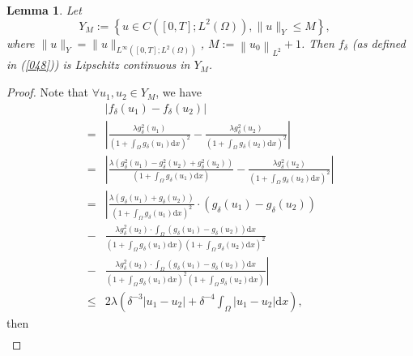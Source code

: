 \documentclass{article}
\numberwithin{equation}{section}
\newtheorem{lemma}{Lemma}[section]
\begin{document}
\begin{lemma}
    Let $$ Y_{M}:=\left\{u \in C\left([0, T] ; L^{2}(\Omega)\right), \|u\|_{Y}\le  M \right\} ,\quad  $$
    where $\|u\|_{Y}=\|u\|_{L^{\infty}\left([0, T] ; L^{2}(\Omega)\right)}$, $M :=\left\|u_{0}\right\|_{L^{2}} +1$. Then $f_\delta$ (as defined in (\ref{048})) is Lipschitz continuous in $Y_M$.
\end{lemma}

\begin{proof}
    Note that
    $\forall u_1, u_2\in Y_M$, we have
    \begin{equation}
    \begin{aligned}
    &\left|f_{\delta}(u_1)-f_{\delta}\left(u_2\right)\right|
    \\=&\left|\frac{\lambda g_{\delta}^{2}(u_1) }{\left(1+\int_{\Omega} g_{\delta}(u_1) \mathrm{d} x\right)^{2}}-\frac{\lambda g_{\delta}^{2}(u_2) }{\left(1+\int_{\Omega} g_{\delta}(u_2) \mathrm{d} x\right)^{2}}\right|
    \\=&\left|\frac{\lambda\left( g_{\delta}^{2}(u_1) -
     g_{\delta}^{2}(u_2) + g_{\delta}^{2}(u_2) \right)}{\left(1+\int_{\Omega} g_{\delta}(u_1) \mathrm{d} x\right)}-\frac{\lambda g_{\delta}^{2}(u_2) }{\left(1+\int_{\Omega} g_{\delta}(u_2) \mathrm{d} x\right)^{2}}\right|
    \\=  &\left| \frac{\lambda\left(g_{\delta}(u_1)+g_{\delta}\left(u_2\right)\right)}{\left(1+\int_{\Omega} g_{\delta}(u_1) \mathrm{d} x\right)^{2}} \cdot\left(g_{\delta}(u_1)-g_{\delta}\left(u_2\right)\right) \right.
    \\ -&\frac{\lambda g_{\delta}^{2}\left(u_2\right) \cdot \int_{\Omega}\left(g_{\delta}(u_1)-g_{\delta}\left(u_2\right)\right) \mathrm{d} x}{\left(1+\int_{\Omega} g_{\delta}(u_1) \mathrm{d} x\right)^{}\left(1+\int_{\Omega} g_{\delta}\left(u_2\right) \mathrm{d} x\right)^{2}}
    \\-&\left. \frac{\lambda g_{\delta}^{2} \left(u_2\right)  \cdot \int_{\Omega}\left(g_{\delta}(u_1)-g_{\delta}\left(u_2\right)\right) \mathrm{d} x}{\left(1+\int_{\Omega} g_{\delta}(u_1) \mathrm{d} x\right)^{2}\left(1+\int_{\Omega} g_{\delta}\left(u_2\right) \mathrm{d} x\right)^{}} \right|
    \\ \le &2 \lambda\left(\delta^{-3}\left|u_1-u_2\right|+\delta^{-4} \int_{\Omega}\left|u_1-u_2\right| \mathrm{d} x\right),
    \end{aligned}\label{015}
    \end{equation}
    then
    \begin{equation*}
    \begin{aligned}

\end{aligned}
\end{equation*}
\end{proof}
\end{document}
